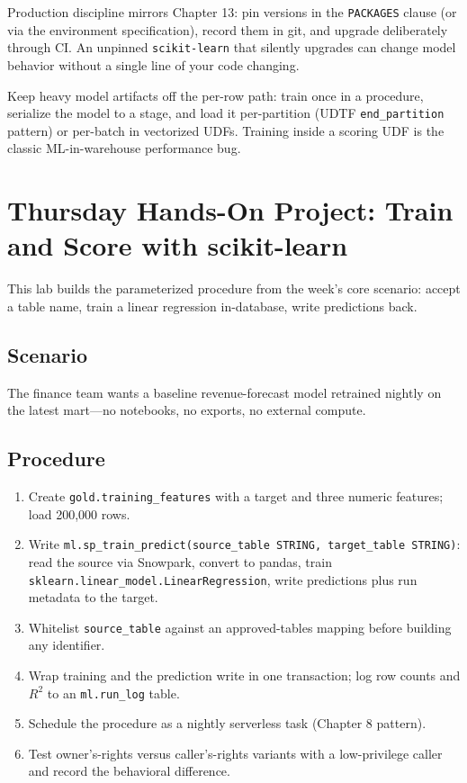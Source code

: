 Production discipline mirrors Chapter 13: pin versions in the \texttt{PACKAGES} clause (or via the environment specification), record them in git, and upgrade deliberately through CI. An unpinned \texttt{scikit-learn} that silently upgrades can change model behavior without a single line of your code changing.

\begin{tipbox}
Keep heavy model artifacts off the per-row path: train once in a procedure, serialize the model to a stage, and load it per-partition (UDTF \texttt{end\_partition} pattern) or per-batch in vectorized UDFs. Training inside a scoring UDF is the classic ML-in-warehouse performance bug.
\end{tipbox}

\section{Thursday Hands-On Project: Train and Score with scikit-learn}
This lab builds the parameterized procedure from the week's core scenario: accept a table name, train a linear regression in-database, write predictions back.

\subsection*{Scenario}
The finance team wants a baseline revenue-forecast model retrained nightly on the latest mart---no notebooks, no exports, no external compute.

\subsection*{Procedure}
\begin{enumerate}
    \item Create \texttt{gold.training\_features} with a target and three numeric features; load 200{,}000 rows.
    \item Write \texttt{ml.sp\_train\_predict(source\_table STRING, target\_table STRING)}: read the source via Snowpark, convert to pandas, train \texttt{sklearn.linear\_model.LinearRegression}, write predictions plus run metadata to the target.
    \item Whitelist \texttt{source\_table} against an approved-tables mapping before building any identifier.
    \item Wrap training and the prediction write in one transaction; log row counts and $R^2$ to an \texttt{ml.run\_log} table.
    \item Schedule the procedure as a nightly serverless task (Chapter 8 pattern).
    \item Test owner's-rights versus caller's-rights variants with a low-privilege caller and record the behavioral difference.
\end{enumerate}

